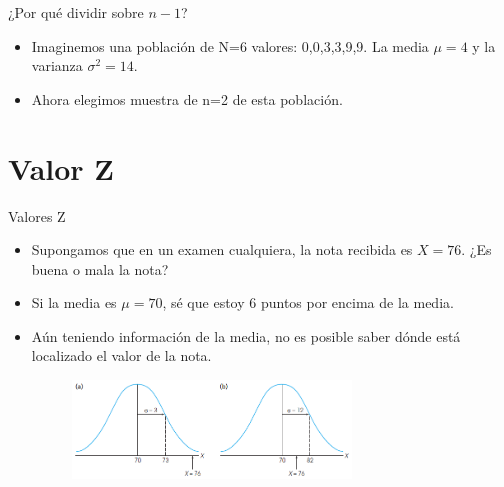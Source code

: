 \documentclass[xcolor=dvipsnames]{beamer}
\begin{document}
\begin{frame}{¿Por qué dividir sobre $n-1$?}
\begin{itemize}
\justifying
\item Imaginemos una población de N=6 valores: 0,0,3,3,9,9. La media $\mu=4$ y la varianza $\sigma^2=14$.
\item Ahora elegimos muestra de n=2 de esta población.

\begin{center}
\begin{table}[H]
\end{table}
\end{center}
\end{itemize}
\end{frame}
 \section{Valor Z}
\begin{frame}{Valores Z}
\begin{itemize}
\justifying
\item Supongamos que en un examen cualquiera, la nota recibida es $X=76$. ¿Es buena o mala la nota?
\pause \item Si la media es $\mu=70$, sé que estoy 6 puntos por encima de la media.
\pause \item Aún teniendo información de la media, no es posible saber dónde está localizado el valor de la nota.
	\begin{figure}[H]
		\centering  
		\caption{ } 
		\includegraphics[width = 0.7\textwidth]{./cap2}
	\end{figure}
\end{itemize}

\end{frame}
\end{document}
